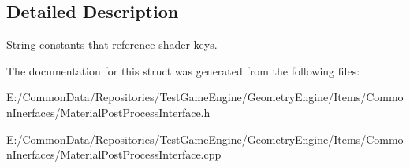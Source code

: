 \subsection{Detailed Description}
String constants that reference shader keys. 

The documentation for this struct was generated from the following files\+:\begin{DoxyCompactItemize}
\item 
E\+:/\+Common\+Data/\+Repositories/\+Test\+Game\+Engine/\+Geometry\+Engine/\+Items/\+Common\+Inerfaces/Material\+Post\+Process\+Interface.\+h\item 
E\+:/\+Common\+Data/\+Repositories/\+Test\+Game\+Engine/\+Geometry\+Engine/\+Items/\+Common\+Inerfaces/Material\+Post\+Process\+Interface.\+cpp\end{DoxyCompactItemize}
